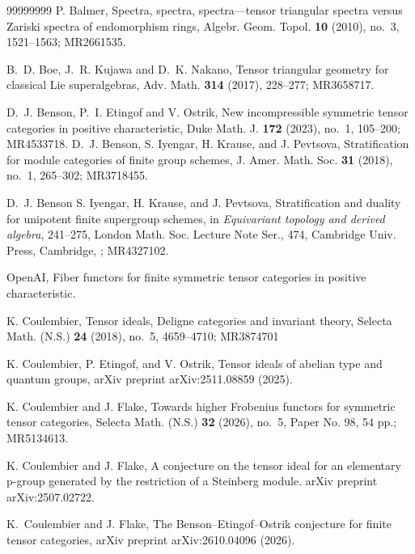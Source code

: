 \documentclass[11pt]{amsart}
\theoremstyle{definition}
\theoremstyle{remark}
\numberwithin{equation}{section}
\begin{document}
    

    
	\begin{thebibliography}{99999999}
     P. Balmer, Spectra, spectra, spectra---tensor triangular spectra versus Zariski spectra of endomorphism rings, Algebr. Geom. Topol. {\bf 10} (2010), no.~3, 1521--1563; MR2661535.

     B.~D. Boe, J.~R. Kujawa and D.~K. Nakano, Tensor triangular geometry for classical Lie superalgebras, Adv. Math. {\bf 314} (2017), 228--277; MR3658717.
    
     D.~J. Benson, P.~I. Etingof and V. Ostrik, New incompressible symmetric tensor categories in positive characteristic, Duke Math. J. {\bf 172} (2023), no.~1, 105--200; MR4533718.
     D.~J. Benson, S. Iyengar, H. Krause, and J. Pevtsova, Stratification for module categories of finite group schemes, J. Amer. Math. Soc. {\bf 31} (2018), no.~1, 265--302; MR3718455.

     D.~J. Benson S. Iyengar, H. Krause, and J. Pevtsova, Stratification and duality for unipotent finite supergroup schemes, in {\it Equivariant topology and derived algebra}, 241--275, London Math. Soc. Lecture Note Ser., 474, Cambridge Univ. Press, Cambridge, ; MR4327102.

     OpenAI, Fiber functors for finite symmetric tensor categories in positive characteristic.

     K. Coulembier, Tensor ideals, Deligne categories and invariant theory, Selecta Math. (N.S.) {\bf 24} (2018), no.~5, 4659--4710; MR3874701
    
     K. Coulembier, P. Etingof, and V. Ostrik, Tensor ideals of abelian type and quantum groups, arXiv preprint arXiv:2511.08859 (2025).
    
     K. Coulembier and J. Flake, Towards higher Frobenius functors for symmetric tensor categories, Selecta Math. (N.S.) {\bf 32} (2026), no.~5, Paper No. 98, 54 pp.; MR5134613.

     K. Coulembier and J. Flake, A conjecture on the tensor ideal for an elementary p-group generated by the restriction of a Steinberg module. arXiv preprint arXiv:2507.02722.

     K.~Coulembier and J. Flake, The Benson--Etingof--Ostrik conjecture for finite tensor categories, arXiv preprint arXiv:2610.04096 (2026).


\end{thebibliography}
\end{document}
